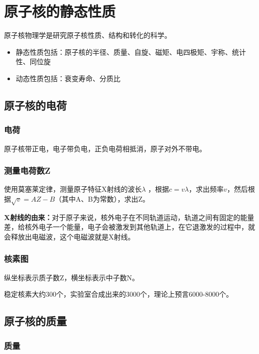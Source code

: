 \chapter{原子核的静态性质}

原子核物理学是研究原子核性质、结构和转化的科学。

\begin{itemize}
    \item 静态性质包括：原子核的半径、质量、自旋、磁矩、电四极矩、宇称、统计性、同位旋
    \item 动态性质包括：衰变寿命、分质比
\end{itemize}

\section{原子核的电荷} 

\subsection{电荷} 
 
原子核带正电，电子带负电，正负电荷相抵消，原子对外不带电。

\subsection{测量电荷数Z}

使用莫塞莱定律，测量原子特征X射线的波长$\lambda$ ，根据$c=v\lambda$，求出频率$v$，然后根据$\sqrt{v}=AZ-B$（其中A、B为常数），求出Z。

\textbf{X射线的由来：}对于原子来说，核外电子在不同轨道运动，轨道之间有固定的能量差，给核外电子一个能量，电子会被激发到其他轨道上，在它退激发的过程中，就会释放出电磁波，这个电磁波就是X射线。

\subsection{核素图}

纵坐标表示质子数Z，横坐标表示中子数N。

稳定核素大约300个，实验室合成出来的3000个，理论上预言6000-8000个。

\section{原子核的质量}

\subsection{质量}

